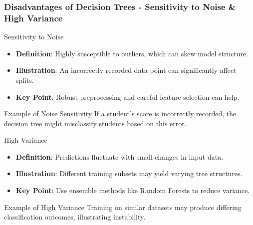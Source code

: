 \documentclass[aspectratio=169]{beamer}
\begin{document}
\begin{frame}[fragile]
    \frametitle{Disadvantages of Decision Trees - Sensitivity to Noise & High Variance}
    \begin{block}{Sensitivity to Noise}
        \begin{itemize}
            \item \textbf{Definition}: Highly susceptible to outliers, which can skew model structure.
            \item \textbf{Illustration}: An incorrectly recorded data point can significantly affect splits.
            \item \textbf{Key Point}: Robust preprocessing and careful feature selection can help.
        \end{itemize}
        
        \begin{block}{Example of Noise Sensitivity}
            If a student's score is incorrectly recorded, the decision tree might misclassify students based on this error.
        \end{block}
    \end{block}

    \begin{block}{High Variance}
        \begin{itemize}
            \item \textbf{Definition}: Predictions fluctuate with small changes in input data.
            \item \textbf{Illustration}: Different training subsets may yield varying tree structures.
            \item \textbf{Key Point}: Use ensemble methods like Random Forests to reduce variance.
        \end{itemize}
        
        \begin{block}{Example of High Variance}
            Training on similar datasets may produce differing classification outcomes, illustrating instability.
        \end{block}
    \end{block}
\end{frame}
\end{document}
